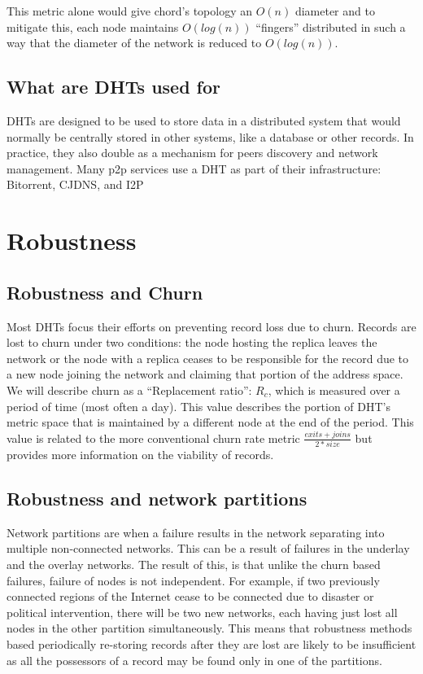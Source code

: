 \documentclass[conference]{IEEEtran}
\begin{document}
This metric alone would give chord's topology an $O(n)$ diameter 
and to mitigate this, each node maintains $O(log(n))$ ``fingers''
 distributed in such a way that the diameter of the network is reduced to $O(log(n))$.

\subsection{What are DHTs used for}

DHTs are designed to be used to store data in a distributed system that would normally be centrally stored in other systems, like a database or other records.
In practice, they also double as a mechanism for peers discovery and network management.
Many p2p services use a DHT as part of their infrastructure: Bitorrent\cite{jimenez2011kademlia}, CJDNS\cite{hodson2013meshnet}, and I2P\cite{zantout2011i2p}

\section{Robustness}

\subsection{Robustness and Churn}
Most DHTs focus their efforts on preventing record loss due to churn.
Records are lost to churn under two conditions: the node hosting the replica leaves the network or the node with a replica ceases to be responsible for the record due to a new node joining the network and claiming that portion of the address space. 
We will describe churn as a ``Replacement ratio'': $R_{c}$, which is measured over a period of time (most often a day).
This value describes the portion of DHT's metric space that is maintained by a different node at the end of the period.
This value is related to the more conventional churn rate metric $\frac{exits + joins}{2*size}$ but provides more information on the viability of records.

\subsection{Robustness and network partitions}
Network partitions are when a failure results in the network separating into multiple non-connected networks.
This can be a result of failures in the underlay and the overlay networks.
The result of this, is that unlike the churn based failures, failure of nodes is not independent.
For example, if two previously connected regions of the Internet cease to be connected due to disaster or political intervention, there will be two new networks, each having just lost all nodes in the other partition simultaneously.
This means that robustness methods based periodically re-storing records after they are lost are likely to be insufficient as all the possessors of a record may be found only in one of the partitions.
\end{document}
